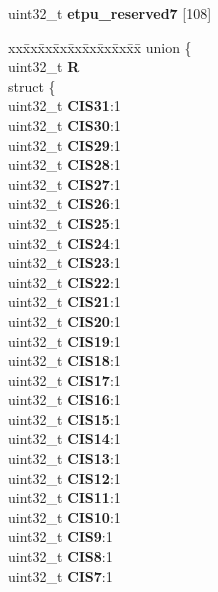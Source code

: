 \begin{DoxyCompactItemize}
\begin{tabbing}
\end{tabbing}\item 
\mbox{\label{structETPU__tag_a4220ef222b2be2764aa6399269f659cb}} 
uint32\+\_\+t {\bfseries etpu\+\_\+reserved7} \mbox{[}108\mbox{]}
\item 
\mbox{\label{structETPU__tag_af23de8fe24f51a1a9cb2ee94060ed2d0}} 
\begin{tabbing}
xx\=xx\=xx\=xx\=xx\=xx\=xx\=xx\=xx\=\kill
union \{\\
\>uint32\_t {\bfseries R}\\
\>struct \{\\
\>\>uint32\_t {\bfseries CIS31}:1\\
\>\>uint32\_t {\bfseries CIS30}:1\\
\>\>uint32\_t {\bfseries CIS29}:1\\
\>\>uint32\_t {\bfseries CIS28}:1\\
\>\>uint32\_t {\bfseries CIS27}:1\\
\>\>uint32\_t {\bfseries CIS26}:1\\
\>\>uint32\_t {\bfseries CIS25}:1\\
\>\>uint32\_t {\bfseries CIS24}:1\\
\>\>uint32\_t {\bfseries CIS23}:1\\
\>\>uint32\_t {\bfseries CIS22}:1\\
\>\>uint32\_t {\bfseries CIS21}:1\\
\>\>uint32\_t {\bfseries CIS20}:1\\
\>\>uint32\_t {\bfseries CIS19}:1\\
\>\>uint32\_t {\bfseries CIS18}:1\\
\>\>uint32\_t {\bfseries CIS17}:1\\
\>\>uint32\_t {\bfseries CIS16}:1\\
\>\>uint32\_t {\bfseries CIS15}:1\\
\>\>uint32\_t {\bfseries CIS14}:1\\
\>\>uint32\_t {\bfseries CIS13}:1\\
\>\>uint32\_t {\bfseries CIS12}:1\\
\>\>uint32\_t {\bfseries CIS11}:1\\
\>\>uint32\_t {\bfseries CIS10}:1\\
\>\>uint32\_t {\bfseries CIS9}:1\\
\>\>uint32\_t {\bfseries CIS8}:1\\
\>\>uint32\_t {\bfseries CIS7}:1\\

\end{tabbing}
\end{DoxyCompactItemize}
